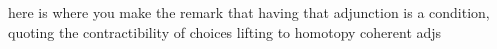 here is where you make the remark that having that adjunction is a condition,
quoting the contractibility of choices lifting to homotopy coherent adjs
